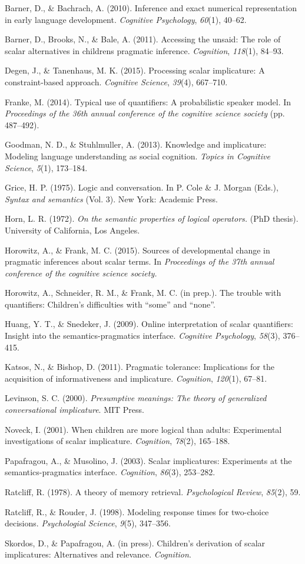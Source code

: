 \documentclass[10pt, letterpaper]{article}
\begin{document}
\setlength{\parindent}{-0.1in} \setlength{\leftskip}{0.125in} \noindent

Barner, D., \& Bachrach, A. (2010). Inference and exact numerical
representation in early language development. \emph{Cognitive
Psychology}, \emph{60}(1), 40--62.

Barner, D., Brooks, N., \& Bale, A. (2011). Accessing the unsaid: The
role of scalar alternatives in childrens pragmatic inference.
\emph{Cognition}, \emph{118}(1), 84--93.

Degen, J., \& Tanenhaus, M. K. (2015). Processing scalar implicature: A
constraint-based approach. \emph{Cognitive Science}, \emph{39}(4),
667--710.

Franke, M. (2014). Typical use of quantifiers: A probabilistic speaker
model. In \emph{Proceedings of the 36th annual conference of the
cognitive science society} (pp. 487--492).

Goodman, N. D., \& Stuhlmuller, A. (2013). Knowledge and implicature:
Modeling language understanding as social cognition. \emph{Topics in
Cognitive Science}, \emph{5}(1), 173--184.

Grice, H. P. (1975). Logic and conversation. In P. Cole \& J. Morgan
(Eds.), \emph{Syntax and semantics} (Vol. 3). New York: Academic Press.

Horn, L. R. (1972). \emph{On the semantic properties of logical
operators.} (PhD thesis). University of California, Los Angeles.

Horowitz, A., \& Frank, M. C. (2015). Sources of developmental change in
pragmatic inferences about scalar terms. In \emph{Proceedings of the
37th annual conference of the cognitive science society.}

Horowitz, A., Schneider, R. M., \& Frank, M. C. (in prep.). The trouble
with quantifiers: Children's difficulties with ``some'' and ``none''.

Huang, Y. T., \& Snedeker, J. (2009). Online interpretation of scalar
quantifiers: Insight into the semantics-pragmatics interface.
\emph{Cognitive Psychology}, \emph{58}(3), 376--415.

Katsos, N., \& Bishop, D. (2011). Pragmatic tolerance: Implications for
the acquisition of informativeness and implicature. \emph{Cognition},
\emph{120}(1), 67--81.

Levinson, S. C. (2000). \emph{Presumptive meanings: The theory of
generalized conversational implicature}. MIT Press.

Noveck, I. (2001). When children are more logical than adults:
Experimental investigations of scalar implicature. \emph{Cognition},
\emph{78}(2), 165--188.

Papafragou, A., \& Musolino, J. (2003). Scalar implicatures: Experiments
at the semantics-pragmatics interface. \emph{Cognition}, \emph{86}(3),
253--282.

Ratcliff, R. (1978). A theory of memory retrieval. \emph{Psychological
Review}, \emph{85}(2), 59.

Ratcliff, R., \& Rouder, J. (1998). Modeling response times for
two-choice decisions. \emph{Psychologial Science}, \emph{9}(5),
347--356.

Skordos, D., \& Papafragou, A. (in press). Children's derivation of
scalar implicatures: Alternatives and relevance. \emph{Cognition}.
\end{document}
